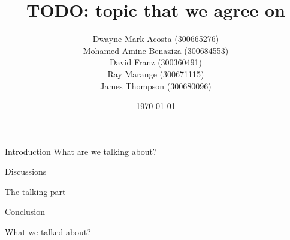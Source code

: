 \documentclass{beamer}
\title{TODO: topic that we agree on}
\author{Dwayne Mark Acosta (300665276) \\ Mohamed Amine Benaziza (300684553) \\ David Franz (300360491) \\ Ray Marange (300671115) \\ James Thompson (300680096)}
\date{\today}
\begin{document}
\frame{\titlepage}

\begin{frame}{Introduction}
What are we talking about?
\end{frame}

\begin{frame}{Discussions}

The talking part

\end{frame}


\begin{frame}{Conclusion}

What we talked about?
    
\end{frame}
\end{document}
